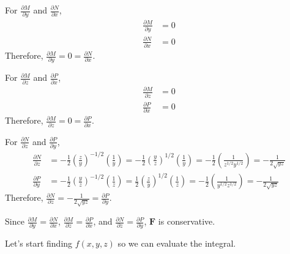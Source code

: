 \documentclass{article}
\newcommand{\lrp}[1]{\left( #1 \right)}
\newcommand{\F}[0]{\mathbf{F}}
\begin{document}
{}
For $\displaystyle \frac{\partial M}{\partial y}$ and $\displaystyle \frac{\partial N}{\partial x}$,
\begin{align*}
    \frac{\partial M}{\partial y}&=0\\
    \frac{\partial N}{\partial x}&=0
\end{align*}
Therefore, $\displaystyle \frac{\partial M}{\partial y}=0=\displaystyle \frac{\partial N}{\partial x}$.

{}
For $\displaystyle \frac{\partial M}{\partial z}$ and $\displaystyle\frac{\partial P}{\partial x}$,
\begin{align*}
    \frac{\partial M}{\partial z}&=0\\
    \frac{\partial P}{\partial x}&=0
\end{align*}
Therefore, $\displaystyle \frac{\partial M}{\partial z}=0=\displaystyle\frac{\partial P}{\partial x}$.

{}
For $\displaystyle \frac{\partial N}{\partial z}$ and $\displaystyle\frac{\partial P}{\partial y}$,
\begin{align*}
    \frac{\partial N}{\partial z}&=-\frac{1}{2}\lrp{\frac{z}{y}}^{-1/2}\lrp{\frac{1}{y}}=-\frac{1}{2}\lrp{\frac{y}{z}}^{1/2}\lrp{\frac{1}{y}}=-\frac{1}{2}\lrp{\frac{1}{z^{1/2}y^{1/2}}}=-\frac{1}{2\sqrt{yz}}\\
    \frac{\partial P}{\partial y}&=-\frac{1}{2}\lrp{\frac{y}{z}}^{-1/2}\lrp{\frac{1}{z}}=\frac{1}{2}\lrp{\frac{z}{y}}^{1/2}\lrp{\frac{1}{z}}=-\frac{1}{2}\lrp{\frac{1}{y^{1/2}z^{1/2}}}=-\frac{1}{2\sqrt{yz}}
\end{align*}
Therefore, $\displaystyle \frac{\partial N}{\partial z}=-\frac{1}{2\sqrt{yz}}=\displaystyle\frac{\partial P}{\partial y}$.

Since $\displaystyle \frac{\partial M}{\partial y}=\frac{\partial N}{\partial x}$, $\displaystyle \frac{\partial M}{\partial z}=\frac{\partial P}{\partial x}$, and $\displaystyle \frac{\partial N}{\partial z}=\frac{\partial P}{\partial y}$, $\F$ is conservative.

Let's start finding $f(x,y,z)$ so we can evaluate the integral.
\end{document}
